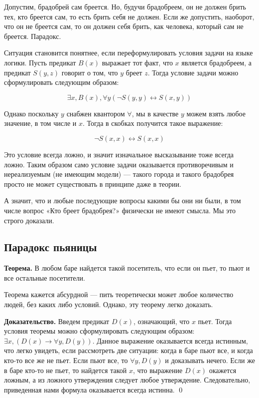 Допустим, брадобрей сам бреется. Но, будучи брадобреем, он не должен брить тех, кто бреется сам, то есть брить себя не должен. Если же допустить, наоборот, что он не бреется сам, то он должен себя брить, как человека, который сам не бреется. Парадокс.

Ситуация становится понятнее, если переформулировать условия задачи на языке логики. Пусть предикат $B(x)$ выражает тот факт, что $x$ является брадобреем, а предикат $S(y, z)$ говорит о том, что $y$ бреет $z$. Тогда условие задачи можно сформулировать следующим образом:

$$\exists x, B(x), \forall y (\neg S(y, y) \leftrightarrow S(x, y))$$

Однако поскольку $y$ снабжен квантором $\forall$, мы в качестве $y$ можем взять любое значение, в том числе и $x$. Тогда в скобках получится такое выражение:

$$\neg S(x, x) \leftrightarrow S(x, x)$$

Это условие всегда ложно, и значит изначальное высказывание тоже всегда ложно. Таким образом само условие задачи оказывается противоречивым и нереализуемым (не имеющим модели) — такого города и такого брадобрея просто не может существовать в принципе даже в теории.

А значит, что и любые последующие вопросы какими бы они ни были, в том числе вопрос «Кто бреет брадобрея?» физически не имеют смысла. Мы это строго доказали.

\subsection{Парадокс пьяницы}

{\bfseries Теорема.} В любом баре найдется такой посетитель, что если он пьет, то пьют и все остальные посетители.

Теорема кажется абсурдной — пить теоретически может любое количество людей, без каких либо условий. Однако, эту теорему легко доказать.

{\bfseries Доказательство.} Введем предикат $D(x)$, означающий, что $x$ пьет. Тогда условия теоремы можно сформулировать следующим образом: $\exists x, (D(x) \rightarrow \forall y, D(y))$. Данное выражение оказывается всегда истинным, что легко увидеть, если рассмотреть две ситуации: когда в баре пьют все, и когда кто-то все же не пьет. Если пьют все, то $\forall y, D(y)$ и доказывать нечего. Если же в баре кто-то не пьет, то найдется такой $x$, что выражение $D(x)$ окажется ложным, а из ложного утверждения следует любое утверждение. Следовательно, приведенная нами формула оказывается всегда истинна. \qed

